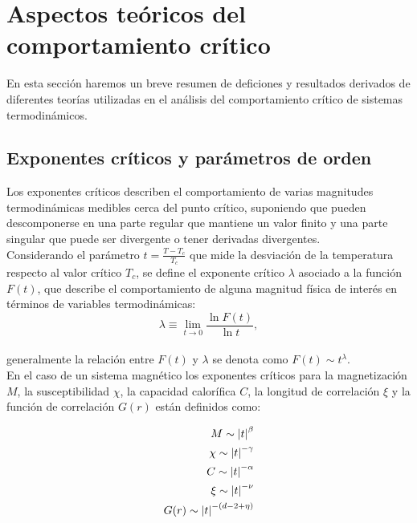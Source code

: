 
\section{Aspectos teóricos del comportamiento crítico}
\label{sec:teoria}

En esta sección haremos un breve resumen de deficiones y resultados derivados de diferentes teorías utilizadas en el análisis del comportamiento crítico de sistemas
 termodinámicos.\\

\subsection{Exponentes críticos y parámetros de orden}

Los exponentes críticos describen el comportamiento de varias magnitudes termodinámicas medibles cerca del punto crítico, suponiendo que pueden descomponerse en
 una parte regular que mantiene un valor finito y una parte singular que puede ser divergente o tener derivadas divergentes.\\
Considerando el parámetro $t=\frac{T-T_{c}}{T_{c}}$ que mide la desviación de la temperatura respecto al valor crítico $T_{c}$,
 se define el exponente crítico $\lambda$ asociado a la función $F(t)$, que describe el comportamiento de alguna magnitud
 f\'isica de inter\'es en t\'erminos de variables termodin\'amicas:
\\
\begin{equation}
	\lambda\equiv \lim_{t \to 0}\frac{\ln{F(t)}}{\ln{t}},
	\label{eq:defexpcrit}
\end{equation}
\\
 generalmente la relación entre $F(t)$ y $\lambda$ se denota como $F(t)\sim t^{\lambda}$.\\
En el caso de un sistema magnético los exponentes críticos para la magnetización $M$, la susceptibilidad $\chi$, la capacidad calorífica $C$, la longitud de correlación
 $\xi$ y la función de correlación $G(r)$ están definidos como:
\\
\begin{center} 
\begin{eqnarray}
	\label{eq:expcrit_mag}
	M\sim \left\vert t\right\vert^{\beta} \\
	\label{eq:expcrit_susc}
	\chi\sim \left\vert t\right\vert^{-\gamma} \\
	\label{eq:expcrit_cap}
	C\sim \left\vert t\right\vert^{-\alpha} \\
	\label{eq:expcrit_longcorr}
	\xi\sim \left\vert t\right\vert^{-\nu} \\
	\label{eq:expcrit_funccorr}
	G(r)\sim \left\vert t\right\vert^{-(d-2+\eta)}
\end{eqnarray}
\end{center}

